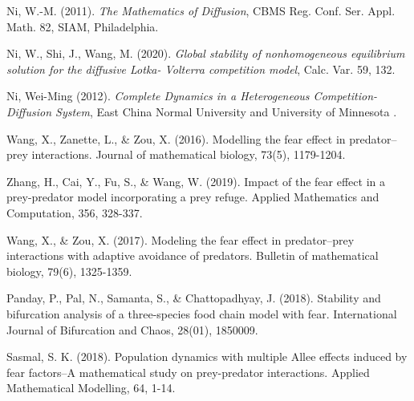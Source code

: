 \documentclass[10pt]{amsart}
\theoremstyle{definition}
\begin{document}
\begin{thebibliography}{}
% 

 Ni, W.-M. (2011).
\newblock\emph{The Mathematics of Diffusion},
\newblock  CBMS Reg. Conf. Ser. Appl. Math. 82, SIAM, Philadelphia.



 Ni, W., Shi, J., Wang, M. (2020).
\newblock\emph{Global stability of nonhomogeneous equilibrium solution for the diffusive Lotka-
Volterra competition model},
\newblock  Calc. Var. 59, 132. 

 
 
 Ni, Wei-Ming (2012).
\newblock\emph{Complete Dynamics in a Heterogeneous Competition-Diffusion System},
\newblock East China Normal University and University of Minnesota . 



 Wang, X., Zanette, L., \& Zou, X. (2016). Modelling the fear effect in predator–prey interactions. Journal of mathematical biology, 73(5), 1179-1204.


 Zhang, H., Cai, Y., Fu, S., \& Wang, W. (2019). Impact of the fear effect in a prey-predator model incorporating a prey refuge. Applied Mathematics and Computation, 356, 328-337.

 Wang, X., \& Zou, X. (2017). Modeling the fear effect in predator–prey interactions with adaptive avoidance of predators. Bulletin of mathematical biology, 79(6), 1325-1359.


 Panday, P., Pal, N., Samanta, S., \& Chattopadhyay, J. (2018). Stability and bifurcation analysis of a three-species food chain model with fear. International Journal of Bifurcation and Chaos, 28(01), 1850009.

 Sasmal, S. K. (2018). Population dynamics with multiple Allee effects induced by fear factors–A mathematical study on prey-predator interactions. Applied Mathematical Modelling, 64, 1-14.



\end{thebibliography}
\end{document}
